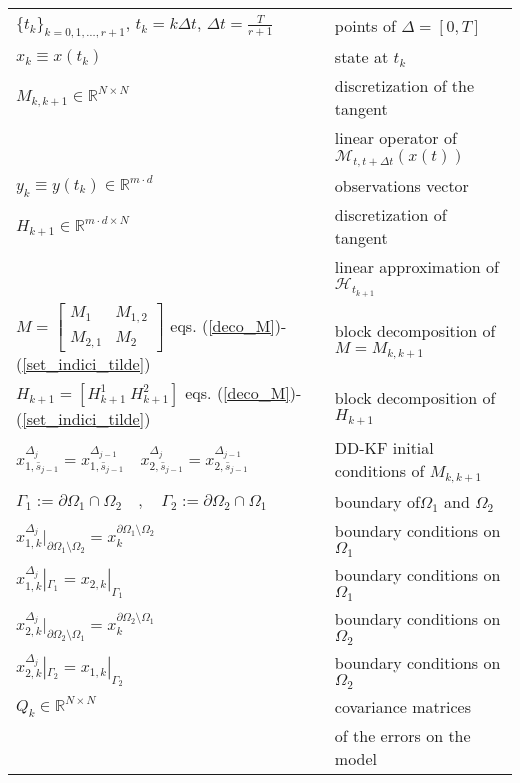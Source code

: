 \documentclass[smallcondensed]{svjour3}
\begin{document}
\begin{table}[]
    \centering
    \begin{tabular}{|l|l|} \hline
   $ \{t_{k}\}_{k=0,1,\ldots,r+1}$,  $t_{k}=k\Delta t$, $\Delta t= \frac{T}{r+1}$ & points of $\Delta= [0,T]$\\
   $x_{k}\equiv x(t_{k})$ & state  at $t_{k}$         \\
   $M_{k,k+1}\in \mathbb{R}^{N\times N}$& discretization of the tangent\\ &linear operator  of $\mathcal{M}_{t,t+\Delta t}( x(t))$      \\
   $y_{k}\equiv y(t_{k})\in \mathbb{R}^{m\cdot d}$&  observations vector\\
   $H_{k+1}\in \mathbb{R}^{m\cdot d \times N}$&  discretization of tangent\\ & linear approximation of $\mathcal{H}_{t_{k+1}}$\\
   $M=\left[\begin{array}{c|c}
M_{1} & M_{1,2}\\
\hline
M_{2,1} & M_{2}
 \end{array} \right]$ eqs. (\ref{deco_M})-(\ref{set_indici_tilde})
 & block decomposition of $M= M_{k,k+1}$ \\
 $ H_{k+1}=\left[H_{k+1}^{1} \ H_{k+1}^{2}\right]$ eqs. (\ref{deco_M})-(\ref{set_indici_tilde}) & block decomposition of $H_{k+1}$\\
$x_{1,\bar{s}_{j-1}}^{\Delta_{j}}=x_{1,\bar{s}_{j-1}}^{\Delta_{j-1}}\quad  x_{2,\bar{s}_{j-1}}^{\Delta_{j}}=x_{2,\bar{s}_{j-1}}^{\Delta_{j-1}}$ & DD-KF initial conditions of $M_{k,k+1}$\\
$ \Gamma_{1}:=\partial \Omega_{1}\cap \Omega_{2} \quad, \quad   \Gamma_{2}:=\partial \Omega_{2}\cap \Omega_{1}$ &  boundary of$\Omega_1$ and $\Omega_2$\\
$x_{1,k}^{\Delta_{j}}|_{\partial \Omega_{1} \setminus \Omega_{2}}={x}_{k}^{\partial \Omega_{1} \setminus \Omega_{2}} $ &  boundary conditions on $\Omega_1$\\
$x_{1,k}^{\Delta_{j}}|_{\Gamma_{1}} = x_{2,k}|_{\Gamma_{1}}$ & boundary conditions  on $\Omega_1$\\
$x_{2,k}^{\Delta_{j}}|_{\partial \Omega_{2} \setminus  \Omega_{1}}={x}_{k}^{\partial \Omega_{2} \setminus \Omega_{1}}$ &boundary conditions  on $\Omega_2$ \\
$ x_{2,k}^{\Delta_{j}}|_{\Gamma_{2}}  = x_{1,k}|_{\Gamma_{2}}$ & boundary conditions  on $\Omega_2$\\
   $Q_{k}\in \mathbb{R}^{N\times N}$ & covariance matrices \\ &of the errors on the model\\

\end{tabular}
\end{table}
\end{document}
